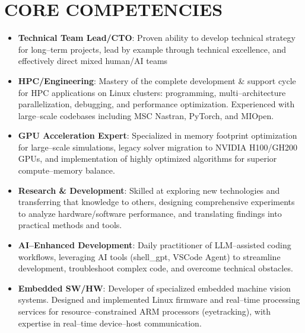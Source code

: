 \documentclass[a4paper]{moderncv}
\begin{document}
\section{CORE COMPETENCIES}

\begin{itemize}
\item \textbf{Technical Team Lead/CTO}: Proven ability to develop technical strategy for long--term projects, lead by example through technical excellence, and effectively direct mixed human/AI teams
\end{itemize}

\begin{itemize}
\item \textbf{HPC/Engineering}: Mastery of the complete development \& support cycle for HPC applications on Linux clusters: programming, multi--architecture parallelization, debugging, and performance optimization. Experienced with large--scale codebases including MSC Nastran, PyTorch, and MIOpen.
\end{itemize}

\begin{itemize}
\item \textbf{GPU Acceleration Expert}: Specialized in memory footprint optimization for large--scale simulations, legacy solver migration to NVIDIA H100/GH200 GPUs, and implementation of highly optimized algorithms for superior compute--memory balance.
\end{itemize}

\begin{itemize}
\item \textbf{Research \& Development}: Skilled at exploring new technologies and transferring that knowledge to others, designing comprehensive experiments to analyze hardware/software performance, and translating findings into practical methods and tools.
\end{itemize}

\begin{itemize}
\item \textbf{AI--Enhanced Development}: Daily practitioner of LLM--assisted coding workflows, leveraging AI tools (shell\_gpt, VSCode Agent) to streamline development, troubleshoot complex code, and overcome technical obstacles.
\end{itemize}

\begin{itemize}
\item \textbf{Embedded SW/HW}: Developer of specialized embedded machine vision systems. Designed and implemented Linux firmware and real--time processing services for resource--constrained ARM processors (eyetracking), with expertise in real--time device--host communication.
\end{itemize}
\end{document}
